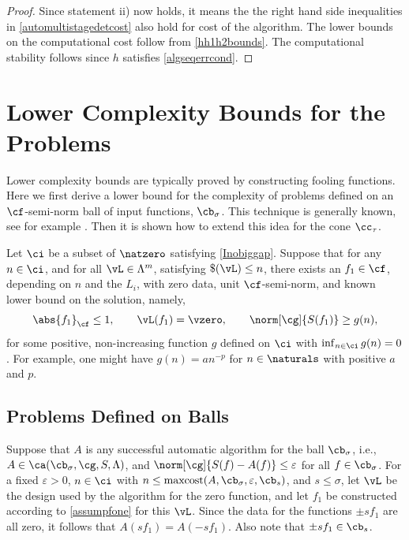 \documentclass[]{elsarticle}
\DeclareMathOperator{\maxcost}{maxcost}
\theoremstyle{definition}
\theoremstyle{remark}
\newcommand{\Fnorm}[1]{\abs{#1}_{\cf}}
\newcommand{\Gnorm}[1]{\norm[\cg]{#1}}
\begin{document}
\begin{proof}
Since statement ii) now holds, it means the the right hand side inequalities in \eqref{automultistagedetcost} also hold for cost of the algorithm.  The lower bounds on the computational cost follow from \eqref{hh1h2bounds}.  The computational stability follows since $h$ satisfies \eqref{algseqerrcond}.
\end{proof}


\section{Lower Complexity Bounds for the Problems} \label{LowBoundSec}
Lower complexity bounds are typically proved by constructing fooling functions.  Here we first derive a lower bound for the complexity of problems defined on an $\cf$-semi-norm ball of input functions, $\cb_\sigma$.  This technique is generally known, see for example \cite[p.\ 11--12]{TraWer98}.  Then it is shown how to extend this idea for the cone $\cc_{\tau}$. 

Let $\ci$ be a subset of $\natzero$ satisfying \eqref{Inobiggap}.  Suppose that for any $n \in \ci$, and for all $\vL \in \Lambda^m$, satisfying $\$(\vL)\le n$, there exists an $f_1 \in \cf$, depending on $n$ and the $L_i$, with zero data, unit $\cf$-semi-norm, and known lower bound on the solution, namely,
\begin{equation} \label{assumpfone}
\Fnorm{f_1} \le 1, \qquad \vL(f_1)= \vzero, \qquad
\norm[\cg]{S(f_1)} \ge g(n), 
\end{equation}
for some positive, non-increasing function $g$ defined on $\ci$ with $\inf_{n \in \ci} g(n)=0$.  For example, one might have $g(n)=a n^{-p}$ for $n \in \naturals$ with positive $a$ and $p$.

\subsection{Problems Defined on Balls} 
Suppose that $A$ is any successful automatic algorithm for the ball $\cb_{\sigma}$, i.e., $A \in \ca(\cb_{\sigma},\cg,S,\Lambda)$, and $\Gnorm{S(f)-A(f)}\le \varepsilon$ for all $f \in \cb_{\sigma}$.  For a fixed $\varepsilon>0$,  $n \in \ci$ with $n \le \maxcost(A,\cb_{\sigma},\varepsilon,\cb_{s})$, and $s \le \sigma$, let $\vL$ be the design used by the algorithm for the zero function, and let $f_1$ be constructed according to \eqref{assumpfone} for this $\vL$.  Since the data for the functions $\pm s f_1$ are all zero, it follows that $A(s f_1)=A(-s f_1)$.  Also note that $\pm s f_1 \in \cb_{s}$.
\end{document}
